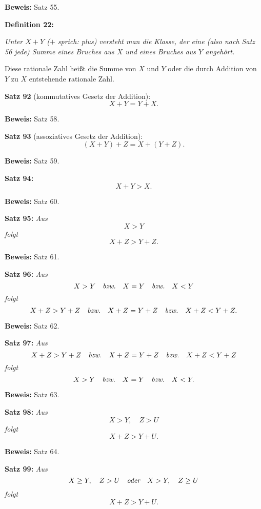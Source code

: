 {\bf Beweis:} Satz 55.
\medskip


{\bf Definition 22:} {\it Unter $X + Y$ {\rm ($+$ sprich: plus)} versteht man die
Klasse, der eine {\rm (also nach Satz 56 jede)} Summe eines Bruches aus
$X$ und eines Bruches aus $Y$ angeh\"ort.

Diese rationale Zahl hei{\ss}t die Summe von $X$ und $Y$ oder die
durch Addition von $Y$ zu $X$ entstehende rationale Zahl.}
\medskip


{\bf Satz 92} (kommutatives Gesetz der Addition):
{\it $$X + Y = Y + X.$$}%

{\bf Beweis:} Satz 58.
\medskip


{\bf Satz 93} (assoziatives Gesetz der Addition):
{\it $$(X + Y) + Z = X + (Y + Z).$$}%

{\bf Beweis:} Satz 59.
\medskip


{\bf Satz 94:} {\it $$X + Y > X.$$}%

{\bf Beweis:} Satz 60.
\medskip


{\bf Satz 95:} {\it Aus
$$X > Y$$
folgt
$$X + Z > Y + Z.$$}%

{\bf Beweis:} Satz 61.
\medskip


{\bf Satz 96:} {\it Aus
$$X > Y\quad\hbox{\it bzw.}\quad X = Y\quad\hbox{\it bzw.}\quad X < Y$$
folgt
$$X + Z > Y + Z\quad\hbox{\it bzw.}\quad X + Z = Y + Z\quad\hbox{\it bzw.}\quad X + Z < Y + Z.$$}%

{\bf Beweis:} Satz 62.
\medskip


{\bf Satz 97:} {\it Aus
$$X + Z > Y + Z\quad\hbox{\it bzw.}\quad X + Z = Y + Z\quad\hbox{\it bzw.}\quad X + Z < Y + Z$$
folgt
$$X > Y\quad\hbox{\it bzw.}\quad X = Y\quad\hbox{\it bzw.}\quad X < Y.$$}%

{\bf Beweis:} Satz 63.
\medskip


{\bf Satz 98:} {\it Aus
$$X > Y,\quad Z > U$$
folgt
$$X + Z > Y + U.$$}%

{\bf Beweis:} Satz 64.
\medskip


{\bf Satz 99:} {\it Aus
$$X \ge Y,\quad Z > U\quad\hbox{\it oder}\quad X > Y,\quad Z \ge U$$
folgt
$$X + Z > Y + U.$$}%

